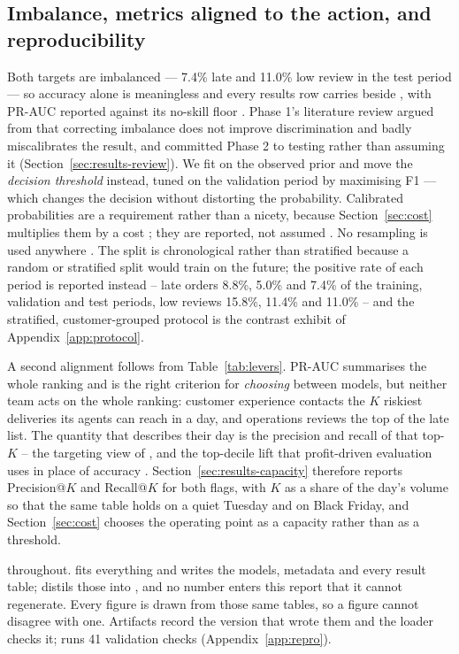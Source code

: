 \subsection{Imbalance, metrics aligned to the action, and reproducibility}
\label{sec:imbalance}

Both targets are imbalanced --- 7.4\% late and 11.0\% low review in the test
period --- so accuracy alone is meaningless and every results row carries
 beside , with PR-AUC reported against
its no-skill floor \citep{saito2015prplot}. Phase 1's literature review argued
from \citet{goorbergh2022imbalance} that correcting imbalance does not improve
discrimination and badly miscalibrates the result, and committed Phase 2 to
testing rather than assuming it (Section~\ref{sec:results-review}). We fit on the
observed prior and move the \emph{decision threshold} instead, tuned on the
validation period by maximising F1 --- which changes the decision without
distorting the probability. Calibrated probabilities are a requirement rather
than a nicety, because Section~\ref{sec:cost} multiplies them by a cost
\citep{elkan2001cost}; they are reported, not assumed
\citep{niculescu2005calibration}. No resampling is used anywhere
\citep{chawla2002smote}. The split is chronological rather than stratified
because a random or stratified split would train on the future; the positive
rate of each period is reported instead -- late orders 8.8\%, 5.0\% and 7.4\%
of the training, validation and test periods, low reviews 15.8\%, 11.4\% and
11.0\% -- and the stratified, customer-grouped protocol is the contrast exhibit
of Appendix~\ref{app:protocol}.

A second alignment follows from Table~\ref{tab:levers}. PR-AUC summarises the
whole ranking and is the right criterion for \emph{choosing} between models,
but neither team acts on the whole ranking: customer experience contacts the
$K$ riskiest deliveries its agents can reach in a day, and operations reviews
the top of the late list. The quantity that describes their day is the precision
and recall of that top-$K$ -- the targeting view of \citet{provost2013data},
and the top-decile lift that profit-driven evaluation uses in place of accuracy
\citep{verbeke2012churn, lessmann2015benchmarking}.
Section~\ref{sec:results-capacity} therefore reports Precision@$K$ and
Recall@$K$ for both flags, with $K$ as a share of the day's volume so that the
same table holds on a quiet Tuesday and on Black Friday, and
Section~\ref{sec:cost} chooses the operating point as a capacity rather than
as a threshold.

 throughout.  fits everything and
writes the models, metadata and every result table; 
distils those into , and no number enters this
report that it cannot regenerate. Every figure is drawn from those same tables,
so a figure cannot disagree with one. Artifacts record the 
version that wrote them and the loader checks it;
 runs 41 validation checks
(Appendix~\ref{app:repro}).

